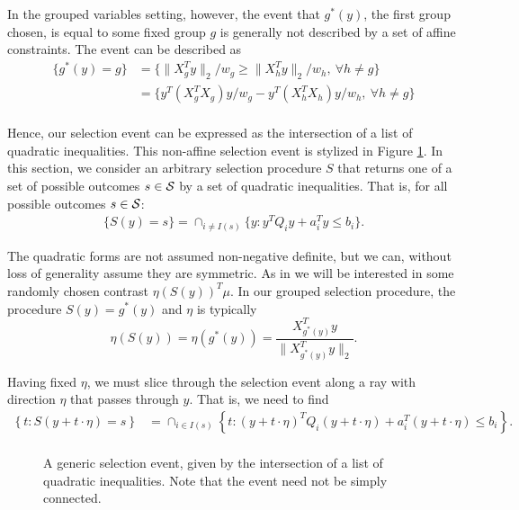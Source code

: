 \documentclass{imsart}
\begin{document}
In the grouped variables setting, however, the event that $g^*(y)$, the first
group chosen, is equal to some fixed group $g$ is generally not described by
a set of affine constraints. The event can be described as
\begin{equation}
\label{eq:first:quadratic}
\begin{aligned}
\{g^*(y)=g\} &= \{ \|X_g^Ty\|_2 /w_g \geq \|X_h^Ty\|_2 /w_h , \ \forall h \neq g\} \\
&=  \{ y^T(X_g^TX_g)y / w_g - y^T(X_h^TX_h)y / w_h, \ \forall h \neq g\} \\
\end{aligned}
\end{equation}

Hence, our selection event can be expressed as 
the intersection of a list of quadratic inequalities. This non-affine selection event is stylized in Figure
\ref{fig:curved}.
In this section, we consider an arbitrary selection procedure
$S$ that returns one of a set of possible outcomes $s \in {\cal S}$ by a set of quadratic inequalities.
That is, for all possible outcomes $s \in {\cal S}$:
\begin{equation}
\label{eq:selection}
\begin{aligned}
\{S(y)=s\} = \cap_{i \neq I(s)} \{y: y^TQ_iy + a_i^Ty\leq b_i \}.
\end{aligned}
\end{equation}

The quadratic forms are not assumed non-negative definite, but we can, without loss of generality
assume they are symmetric.
As in \cite{lasso:exact} we will be interested in some randomly chosen contrast
$\eta(S(y))^T\mu$. In our grouped selection procedure, the procedure $S(y)=g^*(y)$
and $\eta$ is typically 
$$
\eta(S(y)) = \eta(g^*(y)) = \frac{X_{g^*(y)}^Ty}{\|X_{g^*(y)}^Ty\|_2}.
$$

Having fixed $\eta$, we must slice through the selection event along a ray with direction $\eta$ that passes through $y$. 
That is, we need to find
$$
\begin{aligned}
\left\{t: S(y+t \cdot \eta)=s \right\} &= \cap_{i \in I(s)} \left\{t: (y+t \cdot \eta)^T Q_i (y+t \cdot \eta) + a_i^T(y+t \cdot \eta) \leq b_i\right\}. \\
\end{aligned}
$$

\begin{figure}
\label{fig:curved}
\begin{center}
\resizebox{!}{3in}{}
\end{center}
A generic selection event, given by the intersection of a list
of quadratic inequalities. Note that the event need not be simply connected. \end{figure}
\end{document}
